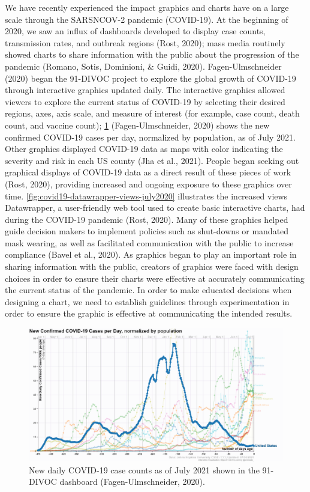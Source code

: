 \documentclass[print]{nuthesis}
\begin{document}
We have recently experienced the impact graphics and charts have on a large scale through the SARSNCOV-2 pandemic (COVID-19).
At the beginning of 2020, we saw an influx of dashboards developed to display case counts, transmission rates, and outbreak regions (Rost, 2020); mass media routinely showed charts to share information with the public about the progression of the pandemic (Romano, Sotis, Dominioni, \& Guidi, 2020).
Fagen-Ulmschneider (2020) began the 91-DIVOC project to explore the global growth of COVID-19 through interactive graphics updated daily.
The interactive graphics allowed viewers to explore the current status of COVID-19 by selecting their desired regions, axes, axis scale, and measure of interest (for example, case count, death count, and vaccine count); \cref{fig:91divoc-cases-july2021} (Fagen-Ulmschneider, 2020) shows the new confirmed COVID-19 cases per day, normalized by population, as of July 2021.
Other graphics displayed COVID-19 data as maps  with color indicating the severity and risk in each US county (Jha et al., 2021).
People began seeking out graphical displays of COVID-19 data as a direct result of these pieces of work (Rost, 2020), providing increased and ongoing exposure to these graphics over time.
\cref{fig:covid19-datawrapper-views-july2020} illustrates the increased views Datawrapper, a user-friendly web tool used to create basic interactive charts, had during the COVID-19 pandemic (Rost, 2020).
Many of these graphics helped guide decision makers to implement policies such as shut-downs or mandated mask wearing, as well as facilitated communication with the public to increase compliance (Bavel et al., 2020).
As graphics began to play an important role in sharing information with the public, creators of graphics were faced with design choices in order to ensure their charts were effective at accurately communicating the current status of the pandemic.
In order to make educated decisions when designing a chart, we need to establish guidelines through experimentation in order to ensure the graphic is effective at communicating the intended results.

\begin{figure}[tbp]

{\centering \includegraphics[width=0.75\linewidth,]{images/91dovic-cases-july2021} 

}

\caption[91-DIVOC new daily case counts as of July 2021]{New daily COVID-19 case counts as of July 2021 shown in the 91-DIVOC dashboard (Fagen-Ulmschneider, 2020).}\label{fig:91divoc-cases-july2021}
\end{figure}
\end{document}
